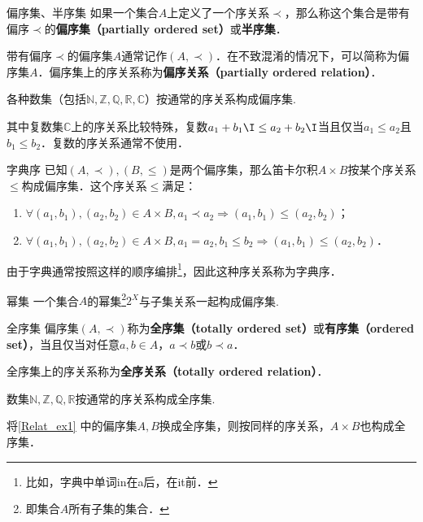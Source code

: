 \begin{definition}{偏序集、半序集}
如果一个集合$A$上定义了一个序关系$\prec$，那么称这个集合是带有偏序$\prec$的\textbf{偏序集（partially ordered set）}或\textbf{半序集}．
\end{definition}

带有偏序$\prec$的偏序集$A$通常记作$(A,\prec)$．在不致混淆的情况下，可以简称为偏序集$A$．偏序集上的序关系称为\textbf{偏序关系（partially ordered relation）}．

\begin{example}{}
各种数集（包括$\mathbb{N},\mathbb{Z},\mathbb{Q},\mathbb{R},\mathbb{C}$）按通常的序关系构成偏序集.

其中复数集$\mathbb{C}$上的序关系比较特殊，复数$a_1+b_1\I \leq a_2+b_2\I$当且仅当$a_1\leq a_2$且$b_1 \leq b_2$．复数的序关系通常不使用．
\end{example}
\begin{example}{字典序}\label{Relat_ex1}
已知$(A,\prec),(B,\leq)$是两个偏序集，那么笛卡尔积$A\times B$按某个序关系$\leqslant$构成偏序集．这个序关系$\leqslant$满足：
\begin{enumerate}
\item $\forall(a_1,b_1),(a_2,b_2) \in A\times B, a_1\prec a_2 \Rightarrow (a_1,b_1)\leqslant(a_2,b_2)$；
\item $\forall(a_1,b_1),(a_2,b_2) \in A\times B, a_1=a_2, b_1\leq b_2 \Rightarrow (a_1,b_1) \leqslant (a_2, b_2)$．
\end{enumerate}

由于字典通常按照这样的顺序编排\footnote{比如，字典中单词in在a后，在it前．}，因此这种序关系称为字典序．
\end{example}
\begin{example}{幂集}
一个集合$A$的幂集\footnote{即集合$A$所有子集的集合．}$2^X$与子集关系一起构成偏序集.
\end{example}

\begin{definition}{全序集}
偏序集$(A,\prec)$称为\textbf{全序集（totally ordered set）}或\textbf{有序集（ordered set）}，当且仅当对任意$a,b \in A$，$a \prec b$或$b \prec a$．
\end{definition}
全序集上的序关系称为\textbf{全序关系（totally ordered relation）}．
\begin{example}{}
数集$\mathbb{N},\mathbb{Z},\mathbb{Q},\mathbb{R}$按通常的序关系构成全序集.
\end{example}
\begin{example}{}
将\autoref{Relat_ex1} 中的偏序集$A,B$换成全序集，则按同样的序关系，$A\times B$也构成全序集．
\end{example}

